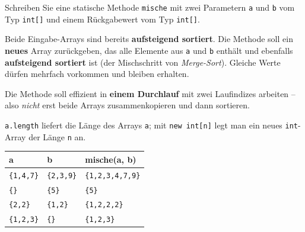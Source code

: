 \documentclass[
	fontsize=12pt,
	paper=a4,
	numbers=noenddot,
	parskip=half,
	openany
]{scrbook}
\begin{document}
Schreiben Sie eine statische Methode \texttt{mische} mit zwei Parametern \texttt{a} und \texttt{b} vom Typ \texttt{int[]} und einem Rückgabewert vom Typ \texttt{int[]}.

Beide Eingabe-Arrays sind bereits \textbf{aufsteigend sortiert}. Die Methode soll ein \textbf{neues} Array zurückgeben, das alle Elemente aus \texttt{a} und \texttt{b} enthält und ebenfalls \textbf{aufsteigend sortiert} ist (der Mischschritt von \emph{Merge-Sort}). Gleiche Werte dürfen mehrfach vorkommen und bleiben erhalten.

Die Methode soll effizient in \textbf{einem Durchlauf} mit zwei Laufindizes arbeiten -- also \emph{nicht} erst beide Arrays zusammenkopieren und dann sortieren.

\begin{hinweis}[Hinweise]
	\texttt{a.length} liefert die Länge des Arrays \texttt{a}; mit \texttt{new int[n]} legt man ein neues \texttt{int}-Array der Länge \texttt{n} an.
\end{hinweis}

\begin{beispiel}[Beispiele]
\begin{center}
\begin{tabular}{l l l}
	\toprule
	\textbf{a} & \textbf{b} & \textbf{mische(a, b)} \\
	\midrule
	\lstinline!{1,4,7}! & \lstinline!{2,3,9}! & \lstinline!{1,2,3,4,7,9}! \\
	\lstinline!{}!      & \lstinline!{5}!     & \lstinline!{5}! \\
	\lstinline!{2,2}!   & \lstinline!{1,2}!   & \lstinline!{1,2,2,2}! \\
	\lstinline!{1,2,3}! & \lstinline!{}!      & \lstinline!{1,2,3}! \\
	\bottomrule
\end{tabular}
\end{center}
\end{beispiel}
\end{document}
